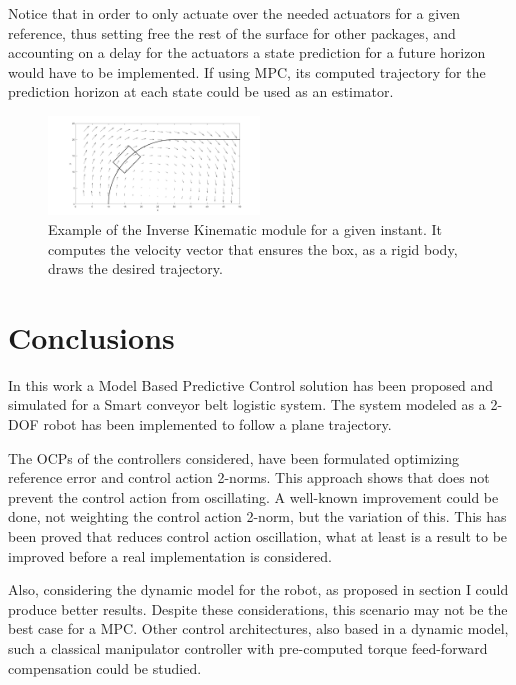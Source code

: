 \documentclass[conference]{IEEEtran}
\begin{document}
Notice that in order to only actuate over the needed actuators for a given reference, thus setting free the rest of the surface for other packages, and accounting on a delay for the actuators a state prediction for a future horizon would have to be implemented. If using MPC, its computed trajectory for the prediction horizon at each state could be used as an estimator.

\begin{figure}[H]
\centering
\includegraphics[width=0.5\textwidth]{ikine.png}
\caption{\label{fig:ikine}Example of the Inverse Kinematic module for a given instant. It computes the velocity vector that ensures the box, as a rigid body, draws the desired trajectory.}
\end{figure}


\section{Conclusions}

In this work a Model Based Predictive Control solution has been proposed and simulated for a Smart conveyor belt logistic system. The system modeled as a 2-DOF robot has been implemented to follow a plane trajectory.

The OCPs of the controllers considered, have been formulated optimizing reference error and control action 2-norms. This approach shows that does not prevent the control action from oscillating. A well-known improvement could be done, not weighting the control action 2-norm, but the variation of this. This has been proved that reduces control action oscillation, what at least is a result to be improved before a real implementation is considered.

Also, considering the dynamic model for the robot, as proposed in section I could produce better results. Despite these considerations, this scenario may not be the best case for a MPC. Other control architectures, also based in a dynamic model, such a classical manipulator controller with pre-computed torque feed-forward compensation could be studied.



\end{document}
